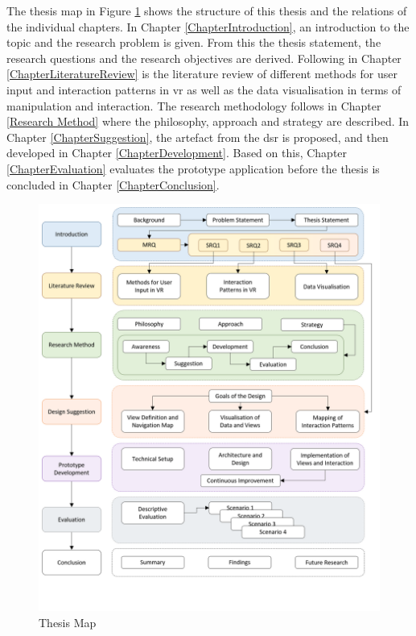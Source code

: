 The thesis map in Figure \ref{fig:thesismap} shows the structure of this thesis and the relations of the individual chapters. In Chapter \ref{ChapterIntroduction}, an introduction to the topic and the research problem is given. From this the thesis statement, the research questions and the research objectives are derived. Following in Chapter \ref{ChapterLiteratureReview} is the literature review of different methods for user input and interaction patterns in \gls{vr} as well as the data visualisation in terms of manipulation and interaction. The research methodology follows in Chapter \ref{Research Method} where the philosophy, approach and strategy are described. In Chapter \ref{ChapterSuggestion}, the artefact from the \gls{dsr} is proposed, and then developed in Chapter \ref{ChapterDevelopment}. Based on this, Chapter \ref{ChapterEvaluation} evaluates the prototype application before the thesis is concluded in Chapter \ref{ChapterConclusion}.
\begin{figure}[ht]
	\begin{center}
		\includegraphics[width=14cm]{03_Figures/06_Introduction/ThesisMap.png}
		\caption{Thesis Map}
		\label{fig:thesismap}
	\end{center}
\end{figure}







